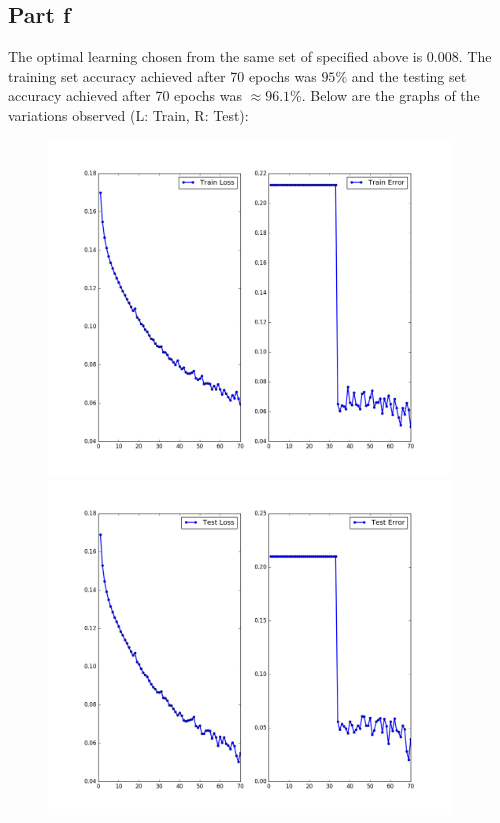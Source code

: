 \documentclass{article}
\begin{document}
\subsection*{Part f}
\begin{flushleft}
The optimal learning chosen from the same set of specified above is 0.008. The training set accuracy achieved after 70 epochs was \(95\%\) and the testing set accuracy achieved after 70 epochs was \(\approx 96.1\%\). Below are the graphs of the variations observed (L: Train, R: Test):
\begin{figure}[H]
\begin{minipage}{0.49\linewidth}
\centering
\includegraphics[width=0.95\textwidth]{Train-Statistics-sgd-batchsize=100-mse.png}
\end{minipage}
\hfill
\begin{minipage}{0.49\linewidth}
\centering
\includegraphics[width=0.95\textwidth]{Test-Statistics-sgd-batchsize=100-mse.png}
\end{minipage}
\end{figure}


\end{flushleft}
\end{document}
